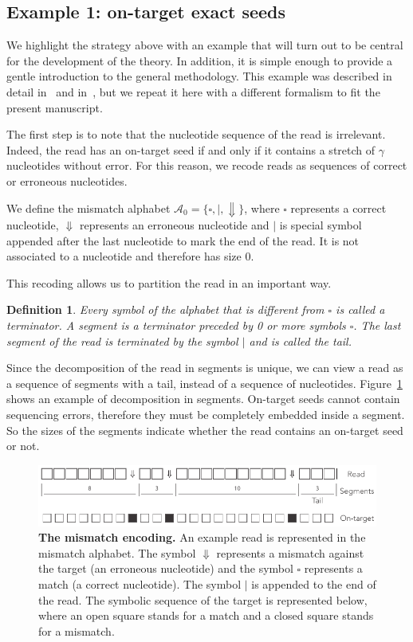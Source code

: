 \documentclass{article}
\newtheorem{definition}{Definition}
\begin{document}
\subsection{Example 1: on-target exact seeds}
\label{sec:example_exact}

We highlight the strategy above with an example that will turn out to be
central for the development of the theory. In addition, it is simple
enough to provide a gentle introduction to the general methodology. This
example was described in detail in~\cite{filion2017analytic} and
in~\cite{filion2018analytic}, but we repeat it here with a different
formalism to fit the present manuscript.

The first step is to note that the nucleotide sequence of the read is
irrelevant. Indeed, the read has an on-target seed if and only if it
contains a stretch of $\gamma$ nucleotides without error. For this reason,
we recode reads as sequences of correct or erroneous nucleotides.

We define the mismatch alphabet $\mathcal{A}_0 = \{\square, |,
\Downarrow\}$, where $\square$ represents a correct nucleotide,
$\Downarrow$ represents an erroneous nucleotide and $|$ is special symbol
appended after the last nucleotide to mark the end of the read. It is not
associated to a nucleotide and therefore has size 0.

This recoding allows us to partition the read in an important way.

\begin{definition}
\label{def:seg}
Every symbol of the alphabet that is different from $\square$ is called a
terminator. A segment is a terminator preceded by 0 or more symbols $\square$.
The last segment of the read is terminated by the symbol $|$ and is called the
tail.
\end{definition}

Since the decomposition of the read in segments is unique, we can view a
read as a sequence of segments with a tail, instead of a sequence of
nucleotides. Figure~\ref{fig:simple} shows an example of decomposition in
segments. On-target seeds cannot contain sequencing errors, therefore they
must be completely embedded inside a segment. So the sizes of the segments
indicate whether the read contains an on-target seed or not.

\begin{figure}[h]
\centering
\includegraphics[scale=0.85]{sketch_simple.pdf}
\caption{\textbf{The mismatch encoding.}
An example read is represented in the mismatch alphabet. The symbol
$\Downarrow$ represents a mismatch against the target (an erroneous
nucleotide) and the symbol $\square$ represents a match (a correct
nucleotide). The symbol $|$ is appended to the end of the read. The
symbolic sequence of the target is represented below, where an open square
stands for a match and a closed square stands for a mismatch.}
\label{fig:simple}
\end{figure}
\end{document}
